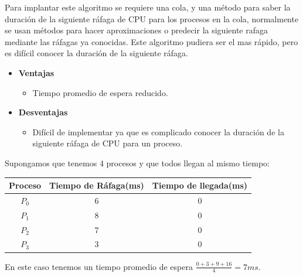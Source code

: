 \documentclass{article}
\begin{document}
Para implantar este algoritmo se requiere una cola, y una método para saber la duración de la siguiente ráfaga
de CPU para los procesos en la cola, normalmente se usan métodos para hacer aproximaciones o predecir la siguiente rafaga
mediante las ráfagas
ya conocidas.
Este algoritmo pudiera ser el mas rápido, pero es difícil conocer la duración de la siguiente ráfaga.
\begin{itemize}
	\item \textbf{Ventajas}
	\begin{itemize}
		\item Tiempo promedio de espera reducido.
	\end{itemize}
	
	\item \textbf{Desventajas}
	\begin{itemize}
		\item Difícil de implementar ya que es complicado conocer la duración de la siguiente ráfaga
		de CPU para un proceso.
	\end{itemize}
\end{itemize}

Supongamos que tenemos 4 procesos y que todos llegan al mismo tiempo:
\begin{center}
	\begin{tabular}{|c|c|c|} \hline
		Proceso & Tiempo de Ráfaga(ms) & Tiempo de llegada(ms) \\ \hline
		$P_{0}$ & 6 & 0 \\
		$P_{1}$ & 8 & 0 \\
		$P_{2}$ & 7 & 0 \\
		$P_{3}$ & 3 & 0 \\ \hline
	\end{tabular}
\end{center}

\vspace{0.4cm}

En este caso tenemos un tiempo promedio de espera $\frac{0 + 3 + 9 + 16}{4} = 7ms$.

\vspace{0.4cm}
\end{document}
